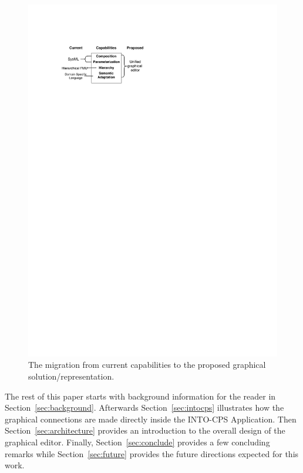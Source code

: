 \begin{figure}[tb]
\centering
\includegraphics[width=0.8\columnwidth]{Images/technologies.pdf}
\caption{The migration from current capabilities to the proposed graphical solution/representation.}
\label{fig:technologies}
\end{figure}





The rest of this paper starts with background information for the reader in Section~\ref{sec:background}. Afterwards Section~\ref{sec:intocps} illustrates how the graphical connections are made directly inside the INTO-CPS Application. Then Section~\ref{sec:architecture} provides an introduction to the overall design of the graphical editor. Finally, Section~\ref{sec:conclude} provides a few concluding remarks while Section~\ref{sec:future} provides the future directions expected for this work.